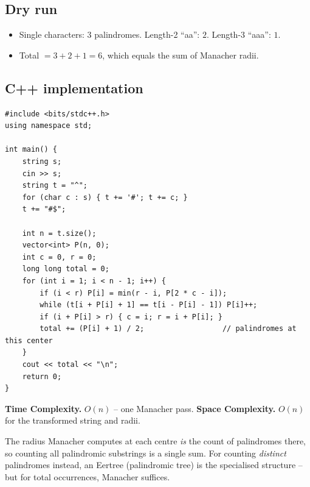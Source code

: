 \subsection*{Dry run}


\begin{itemize}
  \item Single characters: $3$ palindromes. Length-2 ``aa'': $2$.
        Length-3 ``aaa'': $1$.
  \item Total $=3+2+1=6$, which equals the sum of Manacher radii.
\end{itemize}

\subsection*{C++ implementation}

\begin{lstlisting}
#include <bits/stdc++.h>
using namespace std;

int main() {
    string s;
    cin >> s;
    string t = "^";
    for (char c : s) { t += '#'; t += c; }
    t += "#$";

    int n = t.size();
    vector<int> P(n, 0);
    int c = 0, r = 0;
    long long total = 0;
    for (int i = 1; i < n - 1; i++) {
        if (i < r) P[i] = min(r - i, P[2 * c - i]);
        while (t[i + P[i] + 1] == t[i - P[i] - 1]) P[i]++;
        if (i + P[i] > r) { c = i; r = i + P[i]; }
        total += (P[i] + 1) / 2;                  // palindromes at this center
    }
    cout << total << "\n";
    return 0;
}
\end{lstlisting}

\begin{complexitybox}
\textbf{Time Complexity.} $O(n)$ -- one Manacher pass. \textbf{Space
Complexity.} $O(n)$ for the transformed string and radii.
\end{complexitybox}

\begin{takeawaybox}
The radius Manacher computes at each centre \emph{is} the count of
palindromes there, so counting all palindromic substrings is a single sum.
For counting \emph{distinct} palindromes instead, an Eertree (palindromic
tree) is the specialised structure -- but for total occurrences, Manacher
suffices.
\end{takeawaybox}
